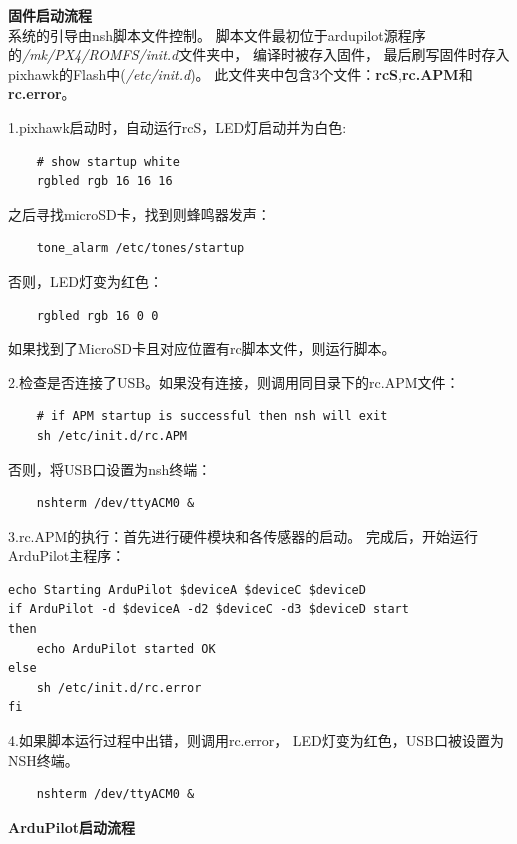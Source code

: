 \documentclass[a4paper,10pt]{ctexart} %
\begin{document}
\vspace{20pt}
\noindent \textbf{固件启动流程}\\

系统的引导由nsh脚本文件控制。
脚本文件最初位于ardupilot源程序的\textit{/mk/PX4/ROMFS/init.d}文件夹中，
编译时被存入固件，
最后刷写固件时存入pixhawk的Flash中(\textit{/etc/init.d})。
此文件夹中包含3个文件：\textbf{rcS},\textbf{rc.APM}和\textbf{rc.error}。

1.pixhawk启动时，自动运行rcS，LED灯启动并为白色:
\begin{lstlisting}
    # show startup white
    rgbled rgb 16 16 16
\end{lstlisting}
之后寻找microSD卡，找到则蜂鸣器发声：
\begin{lstlisting}
	tone_alarm /etc/tones/startup
\end{lstlisting}
否则，LED灯变为红色：
\begin{lstlisting}
    rgbled rgb 16 0 0
\end{lstlisting}
如果找到了MicroSD卡且对应位置有rc脚本文件，则运行脚本。

2.检查是否连接了USB。如果没有连接，则调用同目录下的rc.APM文件：
\begin{lstlisting}
    # if APM startup is successful then nsh will exit
    sh /etc/init.d/rc.APM
\end{lstlisting}
否则，将USB口设置为nsh终端：
\begin{lstlisting}
    nshterm /dev/ttyACM0 &
\end{lstlisting}

3.rc.APM的执行：首先进行硬件模块和各传感器的启动。
完成后，开始运行ArduPilot主程序：
\begin{lstlisting}
echo Starting ArduPilot $deviceA $deviceC $deviceD
if ArduPilot -d $deviceA -d2 $deviceC -d3 $deviceD start
then
    echo ArduPilot started OK
else
    sh /etc/init.d/rc.error
fi
\end{lstlisting}

4.如果脚本运行过程中出错，则调用rc.error，
LED灯变为红色，USB口被设置为NSH终端。
\begin{lstlisting}
	nshterm /dev/ttyACM0 &
\end{lstlisting}

\vspace{20pt}
\noindent \textbf{ArduPilot启动流程}\\
\end{document}

